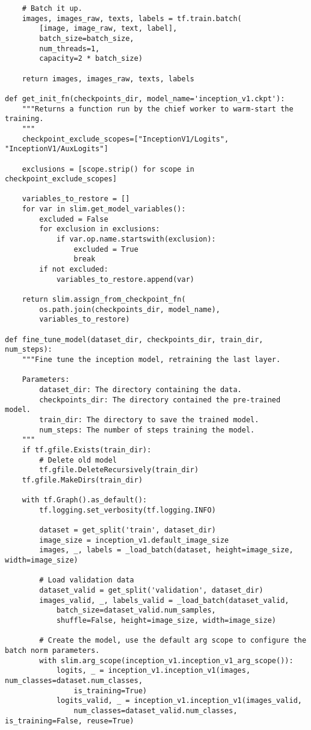 \begin{lstlisting}
    # Batch it up.
    images, images_raw, texts, labels = tf.train.batch(
        [image, image_raw, text, label],
        batch_size=batch_size,
        num_threads=1,
        capacity=2 * batch_size)
    
    return images, images_raw, texts, labels

def get_init_fn(checkpoints_dir, model_name='inception_v1.ckpt'):
    """Returns a function run by the chief worker to warm-start the training.
    """
    checkpoint_exclude_scopes=["InceptionV1/Logits", "InceptionV1/AuxLogits"]
    
    exclusions = [scope.strip() for scope in checkpoint_exclude_scopes]

    variables_to_restore = []
    for var in slim.get_model_variables():
        excluded = False
        for exclusion in exclusions:
            if var.op.name.startswith(exclusion):
                excluded = True
                break
        if not excluded:
            variables_to_restore.append(var)

    return slim.assign_from_checkpoint_fn(
        os.path.join(checkpoints_dir, model_name),
        variables_to_restore)

def fine_tune_model(dataset_dir, checkpoints_dir, train_dir, num_steps):
    """Fine tune the inception model, retraining the last layer.

    Parameters:
        dataset_dir: The directory containing the data.
        checkpoints_dir: The directory contained the pre-trained model.
        train_dir: The directory to save the trained model.
        num_steps: The number of steps training the model.
    """
    if tf.gfile.Exists(train_dir):
        # Delete old model
        tf.gfile.DeleteRecursively(train_dir)
    tf.gfile.MakeDirs(train_dir)

    with tf.Graph().as_default():
        tf.logging.set_verbosity(tf.logging.INFO)
        
        dataset = get_split('train', dataset_dir)
        image_size = inception_v1.default_image_size
        images, _, labels = _load_batch(dataset, height=image_size, width=image_size)

        # Load validation data
        dataset_valid = get_split('validation', dataset_dir)
        images_valid, _, labels_valid = _load_batch(dataset_valid, 
            batch_size=dataset_valid.num_samples, 
            shuffle=False, height=image_size, width=image_size)
        
        # Create the model, use the default arg scope to configure the batch norm parameters.
        with slim.arg_scope(inception_v1.inception_v1_arg_scope()):
            logits, _ = inception_v1.inception_v1(images, num_classes=dataset.num_classes, 
                is_training=True)
            logits_valid, _ = inception_v1.inception_v1(images_valid, 
                num_classes=dataset_valid.num_classes, is_training=False, reuse=True)
            

\end{lstlisting}
